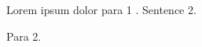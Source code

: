 \documentclass[12pt]{article}
\begin{document}
\title{}
\author{W. Brent Seales
\and Ryan Baumann \\
\and Dot Porter}
\date{}

\maketitle

\section*{}

Lorem ipsum dolor para 1 \citep{Brown:2000p6405}. Sentence 2.

Para 2.

\section*{}

\section*{}



\end{document}
